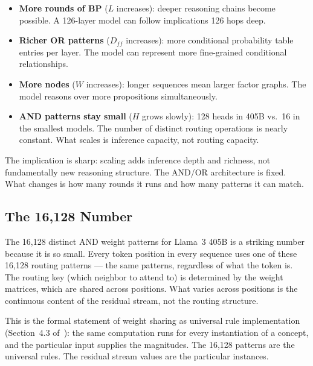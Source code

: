 \begin{itemize}
\item \textbf{More rounds of BP} ($L$ increases): deeper reasoning chains become
possible. A 126-layer model can follow implications 126 hops deep.

\item \textbf{Richer OR patterns} ($D_{ff}$ increases): more conditional probability
table entries per layer. The model can represent more fine-grained conditional
relationships.

\item \textbf{More nodes} ($W$ increases): longer sequences mean larger factor
graphs. The model reasons over more propositions simultaneously.

\item \textbf{AND patterns stay small} ($H$ grows slowly): 128 heads in 405B vs.\
16 in the smallest models. The number of distinct routing operations is nearly
constant. What scales is inference capacity, not routing capacity.
\end{itemize}

The implication is sharp: scaling adds inference depth and richness, not
fundamentally new reasoning structure. The AND/OR architecture is fixed. What
changes is how many rounds it runs and how many patterns it can match.

\subsection*{The 16,128 Number}

The 16,128 distinct AND weight patterns for Llama~3 405B is a striking number
because it is so small. Every token position in every sequence uses one of these
16,128 routing patterns --- the same patterns, regardless of what the token is.
The routing key (which neighbor to attend to) is determined by the weight matrices,
which are shared across positions. What varies across positions is the continuous
content of the residual stream, not the routing structure.

This is the formal statement of weight sharing as universal rule implementation
(Section~4.3 of~\cite{coppola2026transformers}): the same computation runs for every
instantiation of a concept, and the particular input supplies the magnitudes. The
16,128 patterns are the universal rules. The residual stream values are the
particular instances.